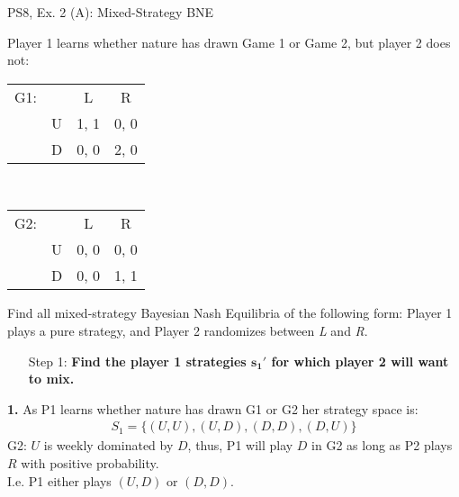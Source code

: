 \begin{frame}{PS8, Ex. 2 (A): Mixed-Strategy BNE}
    \begin{multicols}{2}
      Player 1 learns whether nature has drawn Game 1 or Game 2, but player 2 does not:
      \begin{table}
        \begin{tabular}{ll|c|c|}
          \multicolumn{1}{c}{G1:} & \multicolumn{1}{c}{} & \multicolumn{1}{c}{L} & \multicolumn{1}{c}{R} \\\cline{3-4}
          & U & 1, 1 & 0, 0 \\\cline{3-4}
          & D & 0, 0 & 2, 0 \\\cline{3-4}
        \end{tabular}\\\bigskip
        \begin{tabular}{ll|c|c|}
          \multicolumn{1}{c}{G2:} & \multicolumn{1}{c}{} & \multicolumn{1}{c}{L} & \multicolumn{1}{c}{R} \\\cline{3-4}
          & U & 0, 0 & 0, 0 \\\cline{3-4}
          & D & 0, 0 & 1, 1 \\\cline{3-4}
        \end{tabular}
      \end{table}
      Find all mixed-strategy Bayesian Nash Equilibria of the following form: Player 1 plays a pure strategy, and Player 2 randomizes between \textit{L} and \textit{R}.
      \begin{itemize}
        \item[Step 1:] \textbf{Find the player 1 strategies $\bm{s_1'}$ for which player 2 will want to mix.}
      \end{itemize}
      \vfill\null\columnbreak
      \textbf{1.} As P1 learns whether nature has drawn G1 or G2 her strategy space is:
      \begin{align*}
        S_1=\{(U,U),(U,D),(D,D),(D,U)\}
      \end{align*}
      G2: $U$ is weekly dominated by $D$, thus, P1 will play $D$ in G2 as long as P2 plays $R$ with positive probability.\\\medskip I.e. P1 either plays $(U,D)$ or $(D,D)$.
      \vfill\null
    \end{multicols}
\end{frame}
